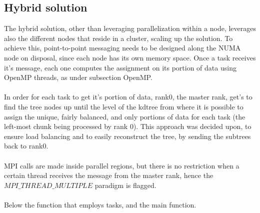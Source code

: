\documentclass[11pt]{article}
\begin{document}
\subsection{Hybrid solution}
The hybrid solution, other than leveraging parallelization within a node, leverages also the different nodes that reside in a cluster, scaling up the solution. To achieve this, point-to-point messaging needs to be designed along the NUMA node on disposal, since each node has its own memory space.
Once a task receives it's message, each one computes the assignment on its portion of data using OpenMP threads, as under subsection OpenMP.\\\\In order for each task to get it's portion of data, rank0, the master rank, get's to find the tree nodes up until the level of the kdtree from where it is possible to assign the unique, fairly balanced, and only portions of data for each task (the left-most chunk being processed by rank 0). This approach was decided upon, to ensure load balancing and to easily reconstruct the tree, by sending the subtrees back to rank0.\\\\MPI calls are made inside parallel regions, but there is no restriction when a certain thread receives the message from the master rank, hence the $MPI\_THREAD\_MULTIPLE$ paradigm is flagged.\\\\Below the function that employs tasks, and the main function.
\end{document}
